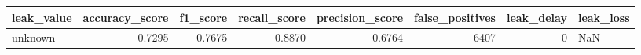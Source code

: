 \begin{tabular}{lrrrrrrl}
\toprule
leak\_value & accuracy\_score & f1\_score & recall\_score & precision\_score & false\_positives & leak\_delay & leak\_loss \\
\midrule
unknown & 0.7295 & 0.7675 & 0.8870 & 0.6764 & 6407 & 0 & NaN \\
\bottomrule
\end{tabular}
